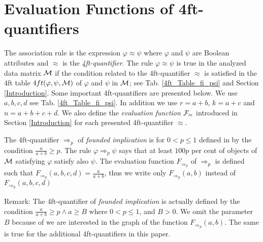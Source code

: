 \section{Evaluation Functions of 4ft-quantifiers} \label{Evaluation_Functions}

The association rule is the expression $\varphi \approx \psi$ where
$\varphi $ and $ \psi $  are Boolean attributes and $ \approx $ 
is the {\it 4ft-quantifier}. The rule $\varphi \approx \psi$ is true in the 
analyzed data matrix $\cal M$ if the condition related to the 4ft-quantifier
$ \approx $  is satisfied in the 4ft table $4ft(\varphi, \psi, {\cal M})$ of $\varphi $
and $\psi$ in $\cal M$; see Tab. \ref{4ft_Table_fi_psi} and Section 
\ref{Introduction}. 
Some important 4ft-quantifiers are presented below. 
We use $ a, b, c, d $ see Tab.  \ref{4ft_Table_fi_psi}.
In addition we use $ r = a + b$, $ k = a + c $ and
$ n = a + b+ c + d$. We also define the 
 {\em evaluation function} ${\cal F}_{\approx}$  introduced in Section \ref{Introduction}
 for each presented 4ft-quantifier $\approx$. 



The 4ft-quantifier $ \Rightarrow_{p} $ of {\it founded
implication \/} is for $ 0 < p \leq 1 $  defined in \cite{Ha:78} 
by the condition
$ \frac{a}{a+b} \geq p $. 
The rule $\varphi \Rightarrow_{p}  \psi $ says that at 
least $100p$ per cent of objects of ${\cal M }$ satisfying 
$\varphi $ satisfy also $\psi$. The evaluation function $ F_{\Rightarrow_{p}}$
of $\Rightarrow_{p}$ is defined such that 
$ F_{\Rightarrow_{p}}(a,b,c,d) = \frac{a}{a+b} $, thus we write only 
$ F_{\Rightarrow_{p}}(a,b)$ instead of $ F_{\Rightarrow_{p}}(a,b,c,d)$

Remark: The 4ft-quantifier  of {\it founded implication \/} is actually 
defined by the condition $ \frac{a}{a+b} \geq p \land a \geq B $  where 
$ 0 < p \leq 1 $, and $ B > 0$. We omit the parameter $B$ because of we are 
interested in the graph of the function $ F_{\Rightarrow_{p}}(a,b)$. 
The same is  true for the additional 4ft-quantifiers  in this paper. 
 

